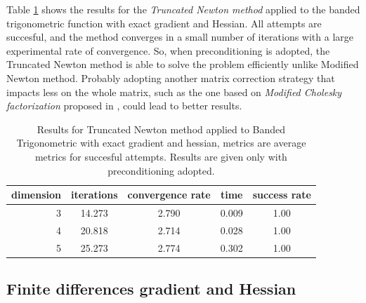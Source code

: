 Table \ref{tab:Truncated_Newton_Banded_Trigonometric_exact} shows the results for the \textit{Truncated Newton method} applied to the banded trigonometric function with exact gradient and Hessian.
All attempts are succesful, and the method converges in a small number of iterations with a large experimental rate of convergence.
So, when preconditioning is adopted, the Truncated Newton method is able to solve the problem efficiently unlike Modified Newton method.
Probably adopting another matrix correction strategy that impacts less on the whole matrix, such as the one based on \textit{Modified Cholesky factorization} proposed in \cite{nocedal-optimization}, could lead to better results.

\begin{table}
\centering
\caption{Results for Truncated Newton method applied to Banded Trigonometric with exact gradient and hessian, metrics are average metrics for succesful attempts. Results are given only with preconditioning adopted.}
\label{tab:Truncated_Newton_Banded_Trigonometric_exact}
\begin{tabular}{r|cc|cc}
\toprule
    dimension & iterations & convergence rate & time & success rate \\
\midrule
3 & 14.273 & 2.790 & 0.009 & 1.00 \\
4 & 20.818 & 2.714 & 0.028 & 1.00 \\
5 & 25.273 & 2.774 & 0.302 & 1.00 \\
\bottomrule
\end{tabular}
\end{table}

\subsection{Finite differences gradient and Hessian}

